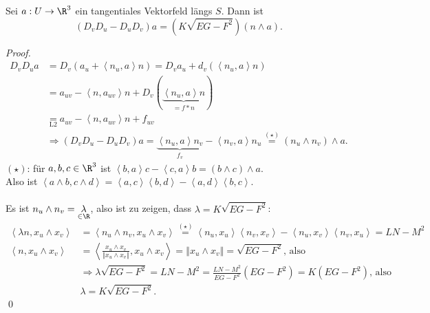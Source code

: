 \begin{lemma}
  Sei \( a: U \to \R^3 \) ein tangentiales Vektorfeld längs \( S \). Dann ist
  \begin{equation*}
    (D_v D_u-D_u D_v)a = (K\sqrt{EG - F^2})(n \wedge a)\text{.}
  \end{equation*}
  \begin{proof}
    \
    \begin{align*}
      D_v D_u a &= D_v(a_u + \left\langle n_u,a \right\rangle n) = D_v a_u + d_v(\left\langle n_u,a \right\rangle n) \\
       &= a_{uv} - \left\langle n,a_{uv} \right\rangle n + D_v(\underbrace{\left\langle n_u,a \right\rangle n}_{=f*n}) \\
       &\underset{\text{L2}}{=} a_{uv} - \left\langle n,a_{uv} \right\rangle n + f_{uv} \\
       &\Rightarrow (D_v D_u - D_u D_v)a = \underbrace{\left\langle n_u,a \right\rangle n_v}_{f_v} - \left\langle n_v,a \right\rangle n_u \overset{(\star)}{=} (n_u \wedge n_v)\wedge a\text{.}
    \end{align*}
    \( (\star) \): für \( a,b,c \in \R^3 \) ist \( \left\langle b,a \right\rangle c - \left\langle c,a \right\rangle b = (b \wedge c) \wedge a \). \\ Also ist \( \left\langle a \wedge b, c \wedge d \right\rangle = \left\langle a, c \right\rangle \left\langle b, d \right\rangle - \left\langle a, d \right\rangle \left\langle b, c \right\rangle \). \\
    \  \\
    Es ist \( n_u \wedge n_v = \underset{\in \R}{\lambda} \), also ist zu zeigen, dass \( \lambda = K\sqrt{EG - F^2} \):
    \begin{align*}
      \left\langle \lambda n, x_u \wedge x_v \right\rangle &= \left\langle n_u \wedge n_v, x_u \wedge x_v \right\rangle \overset{(\star)}{=} \left\langle n_u, x_u \right\rangle \left\langle n_v, x_v \right\rangle - \left\langle n_u, x_v \right\rangle \left\langle n_v,x_u \right\rangle = LN - M^2 \\
      \left\langle n, x_u \wedge x_v \right\rangle &= \left\langle \frac{x_u \wedge x_v}{\left\Vert x_u \wedge x_v \right\Vert}, x_u \wedge x_v \right\rangle = \left\Vert x_u \wedge x_v \right\Vert = \sqrt{EG - F^2}\text{, also} \\
      &\Rightarrow \lambda \sqrt{EG - F^2} = LN - M^2 = \frac{LN - M^2}{EG - F^2}(EG - F^2) = K(EG - F^2)\text{, also} \\
      &\lambda = K\sqrt{EG - F^2}\text{.}
    \end{align*} \qed{}
  \end{proof}
\end{lemma}

